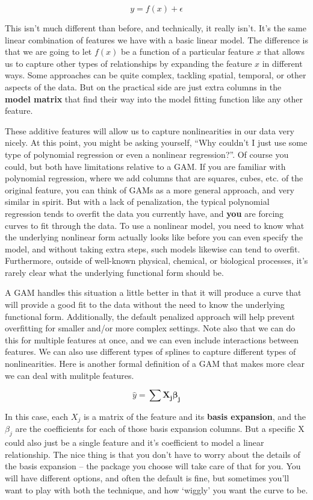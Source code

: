 \documentclass[
  letterpaper,
]{krantz}
\begin{document}
\[
y = f(x) + \epsilon
\]

This isn't much different than before, and technically, it really isn't.
It's the same linear combination of features we have with a basic linear
model. The difference is that we are going to let \(f(x)\) be a function
of a particular feature \(x\) that allows us to capture other types of
relationships by expanding the feature \(x\) in different ways. Some
approaches can be quite complex, tackling spatial, temporal, or other
aspects of the data. But on the practical side are just extra columns in
the \textbf{model matrix} that find their way into the model fitting
function like any other feature.

These additive features will allow us to capture nonlinearities in our
data very nicely. At this point, you might be asking yourself, ``Why
couldn't I just use some type of polynomial regression or even a
nonlinear regression?''. Of course you could, but both have limitations
relative to a GAM. If you are familiar with polynomial regression, where
we add columns that are squares, cubes, etc. of the original feature,
you can think of GAMs as a more general approach, and very similar in
spirit. But with a lack of penalization, the typical polynomial
regression tends to overfit the data you currently have, and
\textbf{you} are forcing curves to fit through the data. To use a
nonlinear model, you need to know what the underlying nonlinear form
actually looks like before you can even specify the model, and without
taking extra steps, such models likewise can tend to overfit.
Furthermore, outside of well-known physical, chemical, or biological
processes, it's rarely clear what the underlying functional form should
be.

A GAM handles this situation a little better in that it will produce a
curve that will provide a good fit to the data without the need to know
the underlying functional form. Additionally, the default penalized
approach will help prevent overfitting for smaller and/or more complex
settings. Note also that we can do this for multiple features at once,
and we can even include interactions between features. We can also use
different types of splines to capture different types of nonlinearities.
Here is another formal definition of a GAM that makes more clear we can
deal with mulitple features.

\[
\hat{y} = \sum \mathbf{X_j\beta_j}
\]

In this case, each \(X_j\) is a matrix of the feature and its
\textbf{basis expansion}, and the \(\beta_j\) are the coefficients for
each of those basis expansion columns. But a specific X could also just
be a single feature and it's coefficient to model a linear relationship.
The nice thing is that you don't have to worry about the details of the
basis expansion -- the package you choose will take care of that for
you. You will have different options, and often the default is fine, but
sometimes you'll want to play with both the technique, and how `wiggly'
you want the curve to be.
\end{document}
